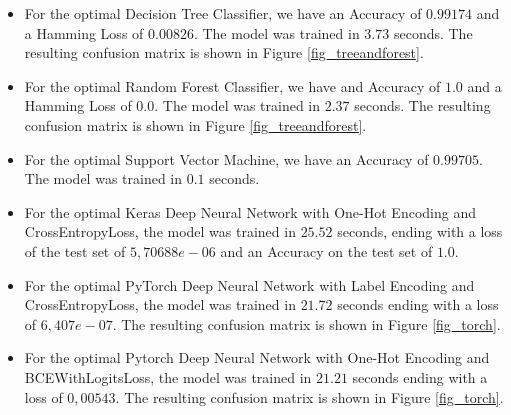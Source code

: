 \documentclass[12pt]{article}
\begin{document}
\begin{itemize}
\item For the optimal Decision Tree Classifier, we have an Accuracy of $0.99174$ and a Hamming Loss of $0.00826$. The model was trained in $3.73$ seconds. 
The resulting confusion matrix is shown in Figure \ref{fig_treeandforest}. 

\item For the optimal Random Forest Classifier, we have and Accuracy of $1.0$ and a Hamming Loss of $0.0$. The model was trained in $2.37$ seconds. 
The resulting confusion matrix is shown in Figure \ref{fig_treeandforest}. 

\item For the optimal Support Vector Machine, we have an Accuracy of $0.99705$. The model was trained in $0.1$ seconds.

\item For the optimal Keras Deep Neural Network with One-Hot Encoding and CrossEntropyLoss, the model was trained in $25.52$ seconds, ending with a loss of the test set of $5,70688e-06$ and an Accuracy on the test set of $1.0$.

\item For the optimal PyTorch Deep Neural Network with Label Encoding and CrossEntropyLoss, the model was trained in $21.72$ seconds ending with a loss of $6,407e-07$. 
The resulting confusion matrix is shown in Figure \ref{fig_torch}.

\item For the optimal Pytorch Deep Neural Network with One-Hot Encoding and BCEWithLogitsLoss, the model was trained in $21.21$ seconds ending with a loss of $0,00543$. 
The resulting confusion matrix is shown in Figure \ref{fig_torch}.
\end{itemize}
\end{document}
